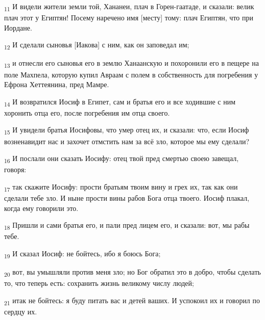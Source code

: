\begin{tcolorbox}
\textsubscript{11} И видели жители земли той, Хананеи, плач в Горен-гаатаде, и сказали: велик плач этот у Египтян! Посему наречено имя [месту] тому: плач Египтян, что при Иордане.
\end{tcolorbox}
\begin{tcolorbox}
\textsubscript{12} И сделали сыновья [Иакова] с ним, как он заповедал им;
\end{tcolorbox}
\begin{tcolorbox}
\textsubscript{13} и отнесли его сыновья его в землю Ханаанскую и похоронили его в пещере на поле Махпела, которую купил Авраам с полем в собственность для погребения у Ефрона Хеттеянина, пред Мамре.
\end{tcolorbox}
\begin{tcolorbox}
\textsubscript{14} И возвратился Иосиф в Египет, сам и братья его и все ходившие с ним хоронить отца его, после погребения им отца своего.
\end{tcolorbox}
\begin{tcolorbox}
\textsubscript{15} И увидели братья Иосифовы, что умер отец их, и сказали: что, если Иосиф возненавидит нас и захочет отмстить нам за всё зло, которое мы ему сделали?
\end{tcolorbox}
\begin{tcolorbox}
\textsubscript{16} И послали они сказать Иосифу: отец твой пред смертью своею завещал, говоря:
\end{tcolorbox}
\begin{tcolorbox}
\textsubscript{17} так скажите Иосифу: прости братьям твоим вину и грех их, так как они сделали тебе зло. И ныне прости вины рабов Бога отца твоего. Иосиф плакал, когда ему говорили это.
\end{tcolorbox}
\begin{tcolorbox}
\textsubscript{18} Пришли и сами братья его, и пали пред лицем его, и сказали: вот, мы рабы тебе.
\end{tcolorbox}
\begin{tcolorbox}
\textsubscript{19} И сказал Иосиф: не бойтесь, ибо я боюсь Бога;
\end{tcolorbox}
\begin{tcolorbox}
\textsubscript{20} вот, вы умышляли против меня зло; но Бог обратил это в добро, чтобы сделать то, что теперь есть: сохранить жизнь великому числу людей;
\end{tcolorbox}
\begin{tcolorbox}
\textsubscript{21} итак не бойтесь: я буду питать вас и детей ваших. И успокоил их и говорил по сердцу их.
\end{tcolorbox}
